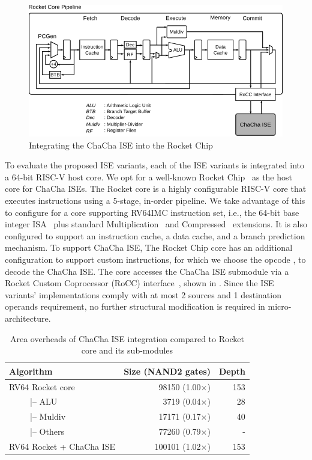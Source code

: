 \begin{figure}
	\centering
	\includegraphics[scale=0.7]{figures/RocketCoreRoCC.png}
	\caption{Integrating the ChaCha ISE into the Rocket Chip}
	\label{fig:ise:RocketCoreRoCC}
\end{figure}

To evaluate the proposed ISE variants, each of the ISE variants is integrated into a 64-bit RISC-V host core. 
We opt for a well-known Rocket Chip~\cite{rocket:16} as the host core for ChaCha ISEs. 
The Rocket core is a highly configurable RISC-V core that executes instructions using a 5-stage, in-order pipeline. 
We take advantage of this to configure for a core supporting RV64IMC instruction set, i.e., the 64-bit base integer ISA~\cite[Chapter 5]{RV:ISA:I} plus standard Multiplication~\cite[Chapter 7]{RV:ISA:I} and Compressed~\cite[Chapter 16]{RV:ISA:I} extensions. It is also configured to support an instruction cache, a data cache, and a branch prediction mechanism.
To support ChaCha ISE, The Rocket Chip core has an additional configuration to support custom instructions, for which we choose the  opcode \cite[Chapter 25]{RV:ISA:I}, to decode the ChaCha ISE.
The core accesses the ChaCha ISE submodule via a Rocket Custom Coprocessor (RoCC) interface~\cite[Section 4]{rocket:16}, shown in . Since the ISE variants' implementations 
comply with at most 2 sources and 1 destination operands requirement, no further structural modification is required in micro-architecture. 

\begin{table}
	\caption{Area overheads of ChaCha ISE integration compared to Rocket core and its sub-modules}
	\label{tab:res:hardcost2}
	\begin{tabular}{lrr}
		\toprule            
		Algorithm        &     Size (NAND2 gates)       & Depth \\
		
		\midrule
		RV64 Rocket core               &    98150 (1.00$\times$)  &  153  \\
		~~~~~|-- ALU                   &     3719 (0.04$\times$)  &   28  \\
		~~~~~|-- Muldiv                &    17171 (0.17$\times$)  &   40  \\
		~~~~~|-- Others                &    77260 (0.79$\times$)  &    -  \\
		RV64 Rocket + ChaCha ISE &   100101 (1.02$\times$)  &  153  \\ 
		
		\bottomrule
	\end{tabular} 
\end{table}

